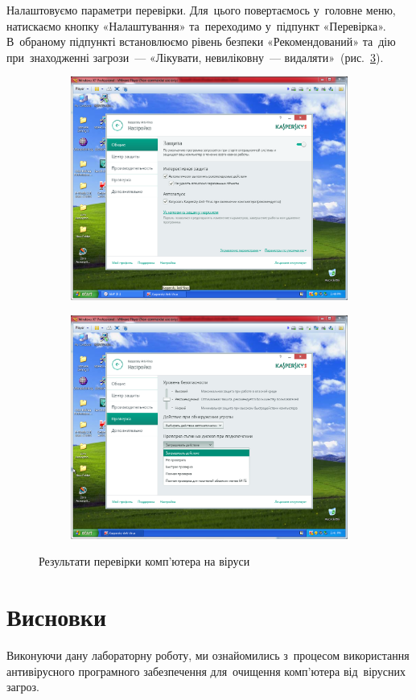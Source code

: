 \documentclass[
	a4paper,
	oneside,
	DIV = 12,
	fontsize = 13pt,
	headings = normal,
]{scrartcl}
\begin{document}
		Налаштовуємо параметри перевірки. Для~цього повертаємось у~головне меню, натискаємо кнопку «Налаштування» та~переходимо у~підпункт «Перевірка». В~обраному підпункті встановлюємо рівень безпеки «Рекомендований» та~дію при~знаходженні загрози~— «Лікувати, невиліковну~— видаляти»~(рис.~\ref{fig:kaspersky-settings}).

		\begin{figure}[!htbp]
			\centering
			\begin{subfigure}{0.5\textwidth}
				\centering
				\includegraphics[height = 9\baselineskip]{./assets/y03s01-pcdiag-lab-05-p13.PNG}
				\caption{}
				\label{subfig:kaspersky-settings-general}
			\end{subfigure}%
			\begin{subfigure}{0.5\textwidth}
				\centering
				\includegraphics[height = 9\baselineskip]{./assets/y03s01-pcdiag-lab-05-p15.PNG}
				\caption{}
				\label{subfig:kaspersky-settings-scan}
			\end{subfigure}%
			\caption{Результати перевірки комп'ютера на віруси}
			\label{fig:kaspersky-settings}
		\end{figure}

	\section{Висновки}
		Виконуючи дану лабораторну роботу, ми ознайомились з~процесом використання антивірусного програмного забезпечення для~очищення комп'ютера від~вірусних загроз.
\end{document}
